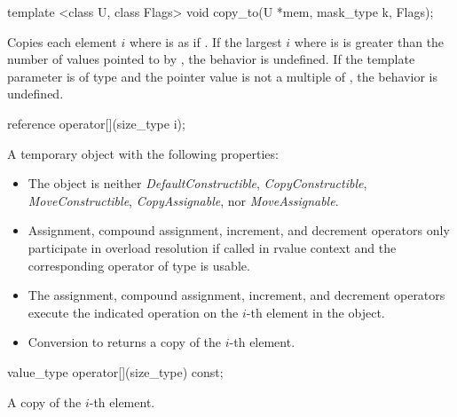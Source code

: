 \begin{itemdecl}
template <class U, class Flags> void copy_to(U *mem, mask_type k, Flags);
\end{itemdecl}
\begin{itemdescr}
  \pnum\effects Copies each \datapar element $i$ where  is \true as if  \foralli.
  \pnum\remarks If the largest $i$ where  is \true is greater than the number of values pointed to by , the behavior is undefined.
  \pnum\remarks If the  template parameter is of type  and the pointer value is not a multiple of , the behavior is undefined.
\end{itemdescr}

\newcommand{\dataparElementReference}{
  \pnum\returns A temporary object with the following properties:
  \begin{itemize}
    \item \remarks The object is neither \textit{DefaultConstructible}, \textit{CopyConstructible}, \textit{MoveConstructible}, \textit{CopyAssignable}, nor \textit{MoveAssignable}.

    \item \remarks Assignment, compound assignment, increment, and decrement operators only participate in overload resolution if
      called in rvalue context and the corresponding operator of type \valuetype is usable.

    \item \effects The assignment, compound assignment, increment, and decrement operators execute the indicated operation on the $i$-th element in the \datapar object.

    \item \effects Conversion to \valuetype returns a copy of the $i$-th element.
  \end{itemize}
}
\begin{itemdecl}
reference operator[](size_type i);
\end{itemdecl}
\begin{itemdescr}
  \dataparElementReference
\end{itemdescr}

\begin{itemdecl}
value_type operator[](size_type) const;
\end{itemdecl}
\begin{itemdescr}
  \pnum\returns A copy of the $i$-th element.
\end{itemdescr}

